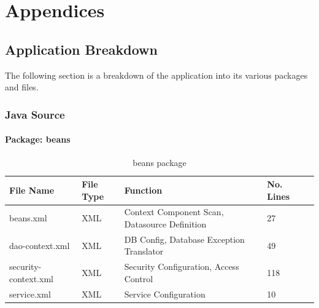 \chapter{Appendices}
\label{appendices}

\section{Application Breakdown}
\label{sec:appbreakdnown}
The following section is a breakdown of the application into its various packages and files.
\subsection{Java Source}
\subsubsection{Package: beans}
\begin{table}[H]
\begin{center}
    \begin{tabular}{| l | l | l| l |p{1cm} |}
    \hline
    File Name & File Type & Function & No. Lines\\ \hline
    beans.xml & XML & Context Component Scan, Datasource Definition & 27 \\ \hline
	dao-context.xml & XML & DB Config, Database Exception Translator & 49 \\ \hline
	security-context.xml & XML & Security Configuration, Access Control & 118 \\ \hline
	service.xml & XML & Service Configuration & 10 \\ \hline
    \end{tabular}
\end{center}
\caption{beans package}
\end{table}

